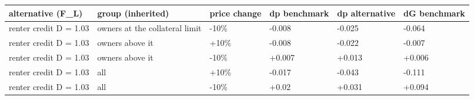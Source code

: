\begingroup\small
\setlength{\tabcolsep}{3pt}
\renewcommand{\arraystretch}{1.04}
\begin{tabularx}{\linewidth}{XXXXXX}
\toprule
alternative (F\_L) & group (inherited) & price change & dp benchmark & dp alternative & dG benchmark \\
\midrule
renter credit D = 1.03 & owners at the collateral limit & -10\% & -0.008 & -0.025 & -0.064 \\
renter credit D = 1.03 & owners above it & +10\% & -0.008 & -0.022 & -0.007 \\
renter credit D = 1.03 & owners above it & -10\% & +0.007 & +0.013 & +0.006 \\
renter credit D = 1.03 & all & +10\% & -0.017 & -0.043 & -0.111 \\
renter credit D = 1.03 & all & -10\% & +0.02 & +0.031 & +0.094 \\
\bottomrule
\end{tabularx}
\endgroup
